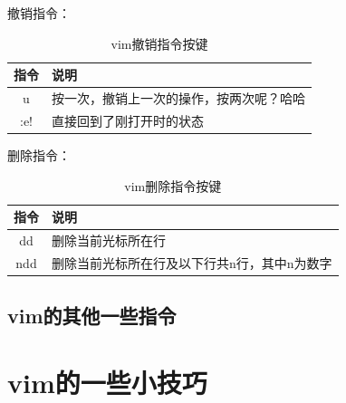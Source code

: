 撤销指令：

\begin{table}[htbp]
  \begin{center}
    \caption{vim撤销指令按键}
    \label{tab:vimUndoKey}
    \begin{tabular}{cl}
      \hline
      指令  & 说明 \\
      \hline
      u    & 按一次，撤销上一次的操作，按两次呢？哈哈 \\
      \hline
      :e!  & 直接回到了刚打开时的状态 \\
      \hline
    \end{tabular}
  \end{center}
\end{table}

删除指令：

\begin{table}[htbp]
  \begin{center}
    \caption{vim删除指令按键}
    \label{tab:vimDeleteKey}
    \begin{tabular}{cl}
      \hline
      指令  & 说明 \\
      \hline
      dd    & 删除当前光标所在行 \\
      \hline
      ndd   & 删除当前光标所在行及以下行共n行，其中n为数字 \\
      \hline
    \end{tabular}
  \end{center}
\end{table}

\subsection{vim的其他一些指令}

\section{vim的一些小技巧}

